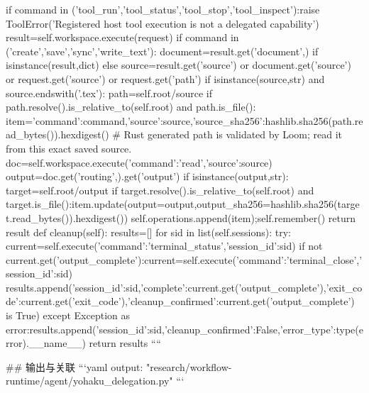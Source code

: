         if command in ('tool_run','tool_status','tool_stop','tool_inspect'):raise ToolError('Registered host tool execution is not a delegated capability')
        result=self.workspace.execute(request)
        if command in ('create','save','sync','write_text'):
            document=result.get('document',{}) if isinstance(result,dict) else {}
            source=result.get('source') or document.get('source') or request.get('source') or request.get('path')
            if isinstance(source,str) and source.endswith('.tex'):
                path=self.root/source
                if path.resolve().is_relative_to(self.root) and path.is_file():
                    item={'command':command,'source':source,'source_sha256':hashlib.sha256(path.read_bytes()).hexdigest()}
                    # Rust generated path is validated by Loom; read it from this exact saved source.
                    doc=self.workspace.execute({'command':'read','source':source})
                    output=doc.get('routing',{}).get('output')
                    if isinstance(output,str):
                        target=self.root/output
                        if target.resolve().is_relative_to(self.root) and target.is_file():item.update(output=output,output_sha256=hashlib.sha256(target.read_bytes()).hexdigest())
                    self.operations.append(item);self.remember()
        return result
    def cleanup(self):
        results=[]
        for sid in list(self.sessions):
            try:
                current=self.execute({'command':'terminal_status','session_id':sid})
                if not current.get('output_complete'):current=self.execute({'command':'terminal_close','session_id':sid})
                results.append({'session_id':sid,'complete':current.get('output_complete'),'exit_code':current.get('exit_code'),'cleanup_confirmed':current.get('output_complete') is True})
            except Exception as error:results.append({'session_id':sid,'cleanup_confirmed':False,'error_type':type(error).__name__})
        return results
````

## 输出与关联
```yaml
output: "research/workflow-runtime/agent/yohaku_delegation.py"
```
